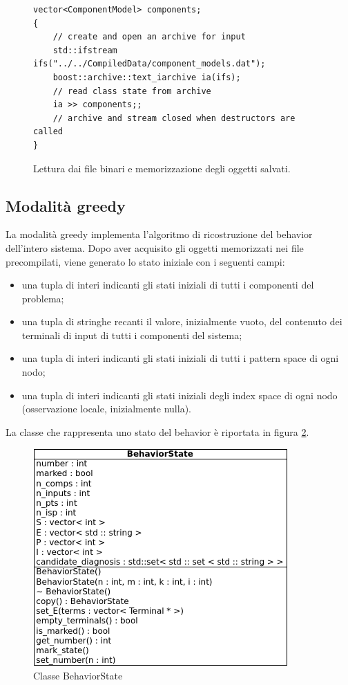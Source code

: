 \begin{figure}[htbp]
\begin{verbatim}
vector<ComponentModel> components;
{
    // create and open an archive for input
    std::ifstream ifs("../../CompiledData/component_models.dat");
    boost::archive::text_iarchive ia(ifs);
    // read class state from archive
    ia >> components;;
    // archive and stream closed when destructors are called
}
\end{verbatim}
\caption{Lettura dai file binari e memorizzazione degli oggetti salvati.}
\label{code:read_files}
\end{figure}

\subsection{Modalità greedy}
La modalità greedy implementa l'algoritmo di ricostruzione del behavior dell'intero sistema. Dopo aver acquisito gli oggetti memorizzati nei file precompilati, viene generato lo stato iniziale con i seguenti campi:
\begin{itemize}
\item una tupla di interi indicanti gli stati iniziali di tutti i componenti del problema;
\item una tupla di stringhe recanti il valore, inizialmente vuoto, del contenuto dei terminali di input di tutti i componenti del sistema;
\item una tupla di interi indicanti gli stati iniziali di tutti i pattern space di ogni nodo;
\item una tupla di interi indicanti gli stati iniziali degli index space di ogni nodo (osservazione locale, inizialmente nulla).
\end{itemize} 
La classe che rappresenta uno stato del behavior è riportata in figura \ref{fig:bhv_state}.

\begin{figure}[htbp]
\centering
\includegraphics[scale=0.6]{./Img/implementazione/bhv_state.png}
\caption{Classe BehaviorState}
\label{fig:bhv_state}
\end{figure}


